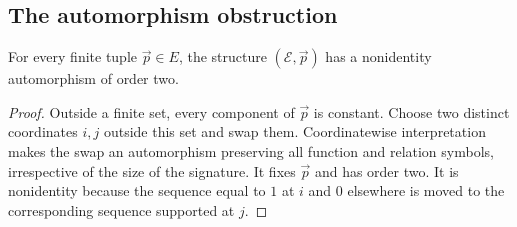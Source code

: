 \subsection{The automorphism obstruction}

\begin{lemma}
\label{lem:pp-involution}
For every finite tuple $\vec p\in E$, the structure
$(\mathcal E,\vec p)$ has a nonidentity automorphism of order two.
\end{lemma}
\begin{proof}
Outside a finite set, every component of $\vec p$ is constant.  Choose
two distinct coordinates $i,j$ outside this set and swap them.
Coordinatewise interpretation makes the swap an automorphism preserving
all function and relation symbols, irrespective of the size of the
signature.  It fixes $\vec p$ and has order two.  It is nonidentity
because the sequence equal to $1$ at $i$ and $0$ elsewhere is moved to
the corresponding sequence supported at $j$.
\end{proof}

